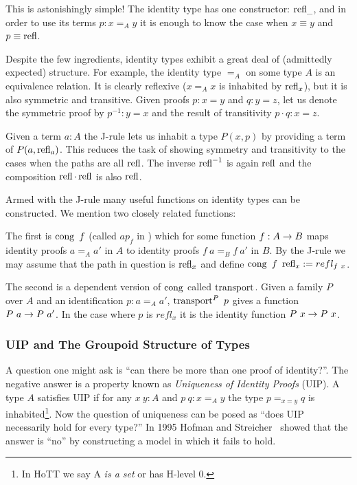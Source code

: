 This is astonishingly simple! The identity type has one constructor: $\operatorname{refl}_{\_}$,
and in order to use its terms $p : x =_A y$ it is enough to know the case when $x
\equiv y$ and $p \equiv \operatorname{refl}$.

Despite the few ingredients, identity types exhibit a great deal of (admittedly
expected) structure. For example, the identity type $=_A$ on some type $A$ is an
equivalence relation. It is clearly reflexive ($x =_A x$ is inhabited by
$\operatorname{refl}_x$), but it is also symmetric and transitive. Given proofs $p : x = y$
and $q : y = z$, let us denote the symmetric proof by $p^{-1} : y = x$ and the
result of transitivity $p \cdot q : x = z$.

Given a term $a:A$ the J-rule lets us inhabit a type $P(x,p)$ by providing a
term of $P(a, \operatorname{refl}_a)$. This reduces the task of showing symmetry and
transitivity to the cases when the paths are all $\operatorname{refl}$. The inverse $\operatorname{refl}^{-1}$
is again $\operatorname{refl}$ and the composition $\operatorname{refl} \cdot \operatorname{refl}$ is also $\operatorname{refl}$.


Armed with the J-rule many useful functions on identity types can be
constructed. We mention two closely related functions:

The first is $\operatorname{cong}~f$ (called $ap_f$ in \cite{hottbook, lemma 2.2.1}) which for some
function $f : A \rightarrow B$ maps identity proofs $a =_A a'$ in $A$ to identity proofs
$f~a =_B f~a'$ in $B$. By the J-rule we may assume that the path in question is
$\operatorname{refl}_x$ and define $\operatorname{cong}~f~\operatorname{refl}_x := refl_{f~x}$.

The second is a dependent version of $\operatorname{cong}$ called $\operatorname{transport}$. Given a
family $P$ over $A$ and an identification $p : a =_A a'$, $\operatorname{transport}^P~p$ gives
a function $P~a \rightarrow P~a'$. In the case where $p$ is $refl_{x}$ it is the
identity function $P~x \rightarrow P~x$.


\subsubsection{UIP and The Groupoid Structure of Types}
A question one might ask is ``can there be more than one proof of identity?''.
The negative answer is a property known as \emph{Uniqueness of Identity Proofs} (UIP). A
type $A$ satisfies UIP if for any $x~y : A$ and $p~q : x =_A y$ the type $p =_{x
= y} q$ is inhabited\footnote{In HoTT we say A \emph{is a set} or has H-level 0.}. Now the
question of uniqueness can be posed as ``does UIP necessarily hold for every type?'' In 1995
Hofman and Streicher~\cite{Hofman1998} showed that the answer is ``no'' by
constructing a model in which it fails to hold.

